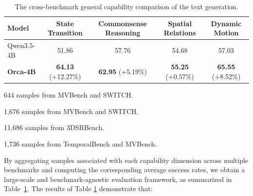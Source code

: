 \begin{table}[!htbp]
  \centering
  \small
  \begin{threeparttable}
  \caption{The cross-benchmark general capability comparison of the text generation.}
  \label{tab:comparison_tol_cap}
    \begin{tabular}{l|cccc} 
    \toprule[1pt]
    Model  & State Transition\tnote{1} & Commonsense Reasoning\tnote{2} & Spatial Relations\tnote{3} & Dynamic Motion\tnote{4} \\
    \midrule[0.5pt]

    Qwen3.5-4B & 51.86 & 57.76 & 54.68 & 57.03 \\

    \rowcolor[rgb]{ .89,  .949,  .851}
    \textbf{Orca-4B}
    & \textbf{64.13} {\scriptsize(+12.27\%)}  
    & \textbf{62.95} {\scriptsize(+5.19\%)}  
    & \textbf{55.25} {\scriptsize(+0.57\%)}  
    & \textbf{65.55} {\scriptsize(+8.52\%)}  \\
    \bottomrule[1pt]
    \end{tabular}

    \begin{tablenotes}
    \footnotesize
    \item[1] 644 samples from {MVBench and SWITCH}.
    \item[2] 1,676 samples from {MVBench and SWITCH}.
    \item[3] 11,686 samples from 3DSRBench.
    \item[4] 1,736 samples from {TemporalBench and MVBench}.
    \end{tablenotes}
  \end{threeparttable}
\end{table}


By aggregating samples associated with each capability dimension across multiple benchmarks and computing the corresponding average success rates, we obtain a large-scale and benchmark-agnostic evaluation framework, as summarized in Table~\ref{tab:comparison_tol_cap}. The results of Table \ref{tab:comparison_tol_cap} demonstrate that:

